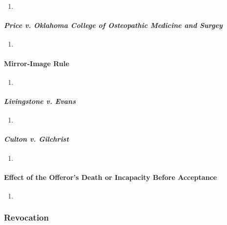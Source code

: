 \begin{enumerate}
    \item %
\end{enumerate}

\paragraph{\emph{Price v. Oklahoma College of Osteopathic Medicine and Surgey}}

\begin{enumerate}
    \item %
\end{enumerate}

\paragraph{Mirror-Image Rule}

\begin{enumerate}
    \item %
\end{enumerate}

\paragraph{\emph{Livingstone v. Evans}}

\begin{enumerate}
    \item %
\end{enumerate}

\paragraph{\emph{Culton v. Gilchrist}}

\begin{enumerate}
    \item %
\end{enumerate}

\paragraph{Effect of the Offeror's Death or Incapacity Before Acceptance}

\begin{enumerate}
    \item %
\end{enumerate}

\subsubsection{Revocation}


